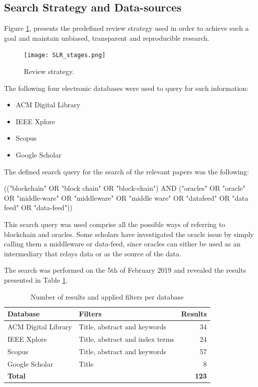 \subsection{Search Strategy and Data-sources}
Figure \ref{fig:/figures/SLR_stages}, presents the predefined review strategy used in order to achieve such a goal and maintain unbiased, transparent and reproducible research.


\begin{figure}[t]
  \begin{center}
    \leavevmode
    \texttt{[image: SLR\_stages.png]}
    \caption{Review strategy.}
    \label{fig:/figures/SLR_stages}
  \end{center}
\end{figure}

The following four electronic databases were used to query for such information:

\begin{itemize}
\item ACM Digital Library
\item IEEE Xplore
\item Scopus
\item Google Scholar
\end{itemize}


The defined search query for the search of the relevant papers was the following:

(("blockchain" OR "block chain" OR "block-chain") 
AND 
("oracles" OR "oracle" OR "middle-ware" OR "middleware" OR "middle ware" OR "datafeed" OR "data feed" OR "data-feed"))

This search query was used comprise all the possible ways of referring to blockchain and oracles. Some scholars have investigated the oracle issue by simply calling them a middleware or data-feed, since oracles can either be used as an intermediary that relays data or as the source of the data.

The search was performed on the 5th of February 2019 and revealed the results presented in Table \ref{search-results-table}.

\begin{table}[H]
\centering
\begin{tabular}{llr}
\hline
\textbf{Database} & \textbf{Filters} & \textbf{Results} \\ \hline
ACM Digital Library & Title, abstract and keywords & 34 \\
IEEE Xplore & Title, abstract and index terms & 24 \\
Scopus & Title, abstract and keywords & 57 \\
Google Scholar & Title & 8 \\ \hline
\textbf{Total} & \textbf{} & \textbf{123} \\ \hline
\end{tabular}
\caption{Number of results and applied filters per database}
\label{search-results-table}
\end{table}

